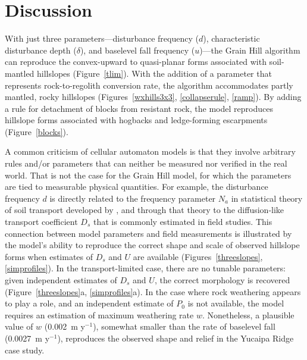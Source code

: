 \documentclass[esurf, manuscript]{copernicus}
\begin{document}



\section{Discussion}

With just three parameters---disturbance frequency ($d$), characteristic disturbance depth ($\delta$), and baselevel fall frequency ($u$)---the Grain Hill algorithm can reproduce the convex-upward to quasi-planar forms associated with soil-mantled hillslopes (Figure~\ref{tlim}). With the addition of a parameter that represents rock-to-regolith conversion rate, the algorithm accommodates partly mantled, rocky hillslopes (Figures~\ref{wxhills3x3}, \ref{collapserule}, \ref{ramp}). By adding a rule for detachment of blocks from resistant rock, the model reproduces hillslope forms associated with hogbacks and ledge-forming escarpments (Figure~\ref{blocks}).

A common criticism of cellular automaton models is that they involve arbitrary rules and/or parameters that can neither be measured nor verified in the real world. That is not the case for the Grain Hill model, for which the parameters are tied to measurable physical quantities. For example, the disturbance frequency $d$ is directly related to the frequency parameter $N_a$ in statistical theory of soil transport developed by \citet{furbish2009statistical}, and through that theory to the diffusion-like transport coefficient $D_s$ that is commonly estimated in field studies. This connection between model parameters and field measurements is illustrated by the model's ability to reproduce the correct shape and scale of observed hillslope forms when estimates of $D_s$ and $U$ are available (Figures~\ref{threeslopes}, \ref{simprofiles}). In the transport-limited case, there are no tunable parameters: given independent estimates of $D_s$ and $U$, the correct morphology is recovered (Figure~\ref{threeslopes}a, \ref{simprofiles}a). In the case where rock weathering appears to play a role, and an independent estimate of $P_0$ is not available, the model requires an estimation of maximum weathering rate $w$. Nonetheless, a plausible value of $w$ (0.002~m y$^{-1}$), somewhat smaller than the rate of baselevel fall (0.0027~m y$^{-1}$), reproduces the observed shape and relief in the Yucaipa Ridge case study. 
\end{document}
